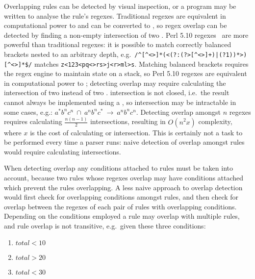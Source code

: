 Overlapping rules can be detected by visual inspection, or a program may be
written to analyse the rule's regexes.  Traditional regexes are equivalent
in computational power to  and can be converted to
, so regex overlap can be detected by finding a non-empty
intersection of two \@.  Perl 5.10 regexes~\cite{perlre} are
more powerful than traditional regexes: it is possible to match correctly
balanced brackets nested to an arbitrary depth, e.g.\
\verb!/^[^<>]*(<(?:(?>[^<>]+)|(?1))*>)[^<>]*$/!  matches
\verb!z<123<pq<>rs>j<r>ml>s!.  Matching balanced brackets requires the
regex engine to maintain state on a stack, so Perl 5.10 regexes are
equivalent in computational power to ; detecting overlap may
require calculating the intersection of two  instead of two
\acronym{FA}.   intersection is not closed, i.e.\ the result
cannot always be implemented using a \acronym{PDA}, so intersection may be
intractable in some cases, e.g.:
$a^{*}b^{n}c^{n}~\cap~a^{n}b^{n}c^{*}~\rightarrow~a^{n}b^{n}c^{n}$.
Detecting overlap amongst $n$ regexes requires calculating
$\frac{n\left(n-1\right)}{2}$ intersections, resulting in
$O\left(n^{2}x\right)$ complexity, where $x$ is the cost of calculating
\acronym{FA} or \acronym{PDA} intersection.  This is certainly not a task
to be performed every time a parser runs: naive detection of overlap
amongst \parsernames{} \numberOFrules{} rules would require calculating
\numberOFruleINTERSECTIONS{} intersections.

When detecting overlap any conditions attached to rules must be taken into
account, because two rules whose regexes overlap may have conditions
attached which prevent the rules overlapping.  A less naive approach to
overlap detection would first check for overlapping conditions amongst
rules, and then check for overlap between the regexes of each pair of rules
with overlapping conditions.  Depending on the conditions employed a rule
may overlap with multiple rules, and rule overlap is not transitive, e.g.\
given these three conditions:

\begin{enumerate}

    \squeezeitems{}

    \item $total < 10$

    \item $total > 20$

    \item $total < 30$

\end{enumerate}

